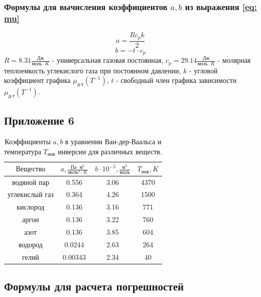 \subsubsection{Формулы для вычисления коэффициентов $a, b$ из выражения \eqref{eq: mu}}

\begin{equation}
    a = \frac{R c_p k}{2}
\end{equation}
\begin{equation}
    b = -t\cdot c_p
\end{equation}
$R = 8.31\frac{\text{Дж}}{\text{моль}\cdot K}$ - универсальная газовая постоянная, $c_p = 29.14 \frac{\text{Дж}}{\text{моль}\cdot K}$ - молярная теплоемкость углекислого газа при постоянном давлении, $k$ - угловой коэффициент графика $\mu_\text{д-т}(T^{-1})$, $t$ - свободный член графика зависимости $\mu_\text{д-т}(T^{-1})$.

\subsection{Приложение 6} \label{Приложение 6}
\begin{table}[h]
    \centering
    \begin{tabular}{|c|c|c|c|}
    \hline
    $\text{Вещество}$ & 
    $a, \frac{\text{Па}\cdot \text{м}^6}{\text{моль}^2\cdot K}$  &
    $b\cdot 10^{-5}, \frac{\text{м}^3}{\text{моль}}$ &
    $T_\text{инв}, K$ \\ \hline
     водяной пар  & 0.556  & 3.06 & 4370 \\ \hline
     углекислый газ & 0.364 & 4.26 & 1500 \\ \hline
     кислород & 0.136 & 3.16 & 771 \\ \hline
     аргон & 0.136 & 3.22 & 760\\ \hline
     азот & 0.136 & 3.85 & 604 \\ \hline
     водород & 0.0244 & 2.63 & 264 \\ \hline
     гелий & 0.00343 & 2.34 & 40 \\ \hline
\end{tabular}
    \caption{Коэффициенты $a, b$ в уравнении Ван-дер-Ваальса и температура $T_\text{инв}$ инверсии для различных веществ.}
    \label{tab:t1}
\end{table}

\subsection{Формулы для расчета погрешностей} \label{Приложение 7}
